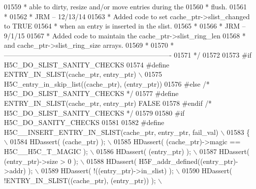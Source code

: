 \begin{DoxyCode}
01559 \textcolor{comment}{ *      able to dirty, resize and/or move entries during the}
01560 \textcolor{comment}{ *      flush.}
01561 \textcolor{comment}{ *}
01562 \textcolor{comment}{ *      JRM -- 12/13/14}
01563 \textcolor{comment}{ *      Added code to set cache\_ptr->slist\_changed to TRUE }
01564 \textcolor{comment}{ *      when an entry is inserted in the slist.}
01565 \textcolor{comment}{ *}
01566 \textcolor{comment}{ *      JRM -- 9/1/15}
01567 \textcolor{comment}{ *      Added code to maintain the cache\_ptr->slist\_ring\_len}
01568 \textcolor{comment}{ *      and cache\_ptr->slist\_ring\_size arrays.}
01569 \textcolor{comment}{ *}
01570 \textcolor{comment}{ *-------------------------------------------------------------------------}
01571 \textcolor{comment}{ */}
01572 
01573 \textcolor{preprocessor}{#if H5C\_DO\_SLIST\_SANITY\_CHECKS}
01574 \textcolor{preprocessor}{#define ENTRY\_IN\_SLIST(cache\_ptr, entry\_ptr) \(\backslash\)}
01575 \textcolor{preprocessor}{    H5C\_entry\_in\_skip\_list((cache\_ptr), (entry\_ptr))}
01576 \textcolor{preprocessor}{#else }\textcolor{comment}{/* H5C\_DO\_SLIST\_SANITY\_CHECKS */}\textcolor{preprocessor}{}
01577 \textcolor{preprocessor}{#define ENTRY\_IN\_SLIST(cache\_ptr, entry\_ptr) FALSE}
01578 \textcolor{preprocessor}{#endif }\textcolor{comment}{/* H5C\_DO\_SLIST\_SANITY\_CHECKS */}\textcolor{preprocessor}{}
01579 
01580 \textcolor{preprocessor}{#if H5C\_DO\_SANITY\_CHECKS}
01581 
01582 \textcolor{preprocessor}{#define H5C\_\_INSERT\_ENTRY\_IN\_SLIST(cache\_ptr, entry\_ptr, fail\_val)             \(\backslash\)}
01583 \textcolor{preprocessor}{\{                                                                              \(\backslash\)}
01584 \textcolor{preprocessor}{    HDassert( (cache\_ptr) );                                                   \(\backslash\)}
01585 \textcolor{preprocessor}{    HDassert( (cache\_ptr)->magic == H5C\_\_H5C\_T\_MAGIC );                        \(\backslash\)}
01586 \textcolor{preprocessor}{    HDassert( (entry\_ptr) );                                                   \(\backslash\)}
01587 \textcolor{preprocessor}{    HDassert( (entry\_ptr)->size > 0 );                                         \(\backslash\)}
01588 \textcolor{preprocessor}{    HDassert( H5F\_addr\_defined((entry\_ptr)->addr) );                           \(\backslash\)}
01589 \textcolor{preprocessor}{    HDassert( !((entry\_ptr)->in\_slist) );                                      \(\backslash\)}
01590 \textcolor{preprocessor}{    HDassert( !ENTRY\_IN\_SLIST((cache\_ptr), (entry\_ptr)) );                     \(\backslash\)}

\end{DoxyCode}
